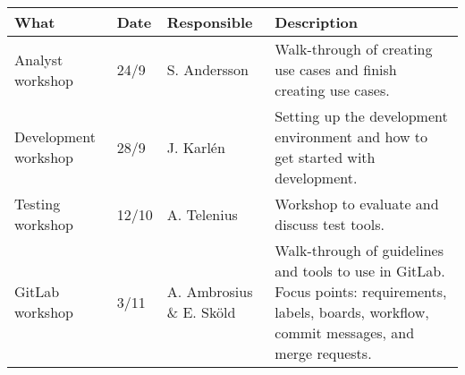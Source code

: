 \begingroup
\begin{table}[ht]
    \renewcommand{\arraystretch}{1.5}
        \begin{tabular}{|M{3.5cm}|M{1cm}|M{2.5cm}|M{6cm}|}
        \hline
        \textbf{What} & \textbf{Date} & \textbf{Responsible} & \textbf{Description} \\
        \hline
        Analyst workshop & 24/9 & S. Andersson & Walk-through of creating use cases and finish creating use cases.\\
        \hline
         Development workshop & 28/9 & J. Karlén & Setting up the development environment and how to get started with development. \\
        \hline
         Testing workshop & 12/10 & A. Telenius & Workshop to evaluate and discuss test tools.\\
        \hline
         GitLab workshop & 3/11  & A. Ambrosius \& E. Sköld & Walk-through of guidelines and tools to use in GitLab. Focus points: requirements, labels, boards, workflow, commit messages, and merge requests.\\
        \hline
        \end{tabular}
\end{table}

\endgroup
